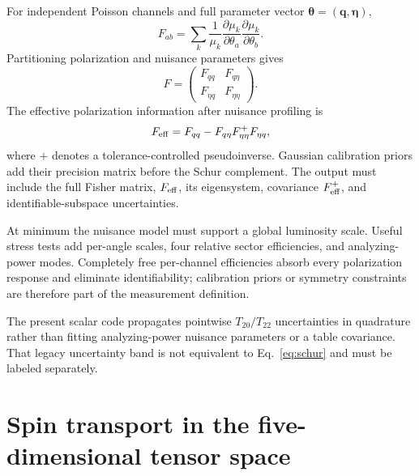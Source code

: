 \documentclass[11pt,a4paper]{article}
\newcommand{\vect}[1]{\bm{#1}}
\begin{document}
For independent Poisson channels and full parameter vector
$\vect\theta=(\vect q,\vect\eta)$,
\begin{equation}
 F_{ab}=\sum_k\frac{1}{\mu_k}
 \frac{\partial\mu_k}{\partial\theta_a}
 \frac{\partial\mu_k}{\partial\theta_b}.
 \label{eq:fisher}
\end{equation}
Partitioning polarization and nuisance parameters gives
\begin{equation}
 F=
 \begin{pmatrix}
 F_{qq}&F_{q\eta}\\F_{\eta q}&F_{\eta\eta}
 \end{pmatrix}.
\end{equation}
The effective polarization information after nuisance profiling is
\begin{equation}
 F_{\rm eff}=F_{qq}-F_{q\eta}F_{\eta\eta}^{+}F_{\eta q},
 \label{eq:schur}
\end{equation}
where $+$ denotes a tolerance-controlled pseudoinverse.  Gaussian calibration
priors add their precision matrix before the Schur complement.  The output must
include the full Fisher matrix, $F_{\rm eff}$, its eigensystem, covariance
$F_{\rm eff}^{+}$, and identifiable-subspace uncertainties.

At minimum the nuisance model must support a global luminosity scale.  Useful
stress tests add per-angle scales, four relative sector efficiencies, and
analyzing-power modes.  Completely free per-channel efficiencies absorb every
polarization response and eliminate identifiability; calibration priors or
symmetry constraints are therefore part of the measurement definition.

The present scalar code propagates pointwise $T_{20}/T_{22}$ uncertainties in
quadrature rather than fitting analyzing-power nuisance parameters or a table
covariance.  That legacy uncertainty band is not equivalent to
Eq.~\eqref{eq:schur} and must be labeled separately.

\section{Spin transport in the five-dimensional tensor space}
\end{document}
